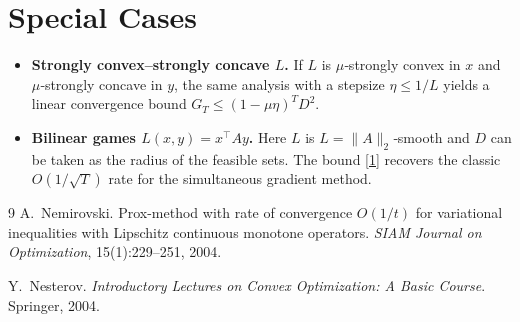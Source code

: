 \documentclass{article}
\begin{document}
\section*{Special Cases}
\begin{itemize}
    \item \textbf{Strongly convex–strongly concave $L$.} If $L$ is $\mu$‑strongly convex in $x$ and $\mu$‑strongly concave in $y$, the same analysis with a stepsize $\eta\le 1/L$ yields a linear convergence bound $G_T\le (1-\mu\eta)^T D^2$.
    \item \textbf{Bilinear games $L(x,y)=x^\top Ay$.} Here $L$ is $L=\|A\|_2$‑smooth and $D$ can be taken as the radius of the feasible sets. The bound \eqref{1} recovers the classic $O(1/\sqrt{T})$ rate for the simultaneous gradient method.
\end{itemize}

\newpage
\begin{thebibliography}{9}
A.~Nemirovski.
\newblock Prox-method with rate of convergence $O(1/t)$ for variational inequalities with Lipschitz continuous monotone operators.
\newblock \emph{SIAM Journal on Optimization}, 15(1):229--251, 2004.

Y.~Nesterov.
\newblock \emph{Introductory Lectures on Convex Optimization: A Basic Course}.
\newblock Springer, 2004.
\end{thebibliography}
\end{document}
